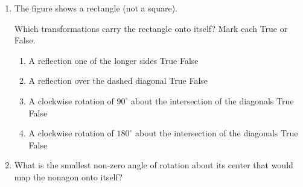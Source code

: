 \documentclass[12pt, twoside]{article}
\begin{document}
\begin{enumerate}
  \item The figure shows a rectangle (not a square).
   \begin{center}
   \end{center}
   Which transformations carry the rectangle onto itself? Mark each True or False.
     \begin{enumerate}
       \item A reflection one of the longer sides \hfill True \quad False
       \item A reflection over the dashed diagonal \hfill True \quad False
       \item A clockwise rotation of $90^\circ$ about the intersection of the diagonals \hfill True \quad False
       \item A clockwise rotation of $180^\circ$ about the intersection of the diagonals \hfill True \quad False
     \end{enumerate}
     \vspace{1cm}

   \item What is the smallest non-zero angle of rotation about its center that would map the nonagon onto itself? \vspace{0.25cm} %
   \begin{center}
    \end{center}

\end{enumerate}
\newpage
\setcounter{page}{1}
\end{document}
